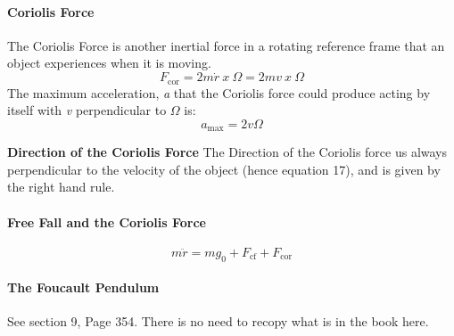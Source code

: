 \paragraph{Coriolis Force}
The Coriolis Force is another inertial force in a rotating reference frame that an object experiences when it is moving. 
\begin{equation}
F_{\text{cor}} = 2m\dot{r} \ x \ \Omega = 2mv \ x \ \Omega
\end{equation}
The maximum acceleration, \textit{a} that the Coriolis force could produce acting by itself with \textit{v} perpendicular to $\Omega$ is:
\begin{equation}
a_{\text{max}} = 2v\Omega 
\end{equation}
\begin{shaded}
\textbf{Direction of the Coriolis Force} \newline
The Direction of the Coriolis force us always perpendicular to the velocity of the object (hence equation 17), and is given by the right hand rule. 
\end{shaded}
\newpage
\paragraph{Free Fall and the Coriolis Force}
\begin{equation}
m\ddot{r} = mg_0 + F_{\text{cf}} + F_{\text{cor}} 
\end{equation}
\paragraph{The Foucault Pendulum}
See section 9, Page 354. There is no need to recopy what is in the book here. 
